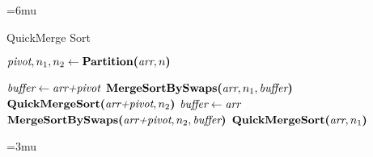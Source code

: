 \begin{algorithm}[H]
	\unboldmath
	\thinmuskip=6mu
	\caption{QuickMerge Sort}
	\begin{algorithmic}[1]
		
		\State
		  
		\EndIf
		
		\State
		\State $\textit{pivot}, n_1, n_2 \gets \textbf{Partition(}\textit{arr}, n\textbf{)}$ 
		
		\State
		 
			\State $\textit{buffer} \gets \textit{arr+pivot}$
			\State $\textbf{MergeSortBySwaps(}\textit{arr}, n_1, \textit{buffer}\textbf{)}$
			\State $\textbf{QuickMergeSort(}\textit{arr+pivot}, n_2\textbf{)}$
		\Else
			\State $\textit{buffer} \gets \textit{arr}$
			\State $\textbf{MergeSortBySwaps(}\textit{arr+pivot}, n_2, \textit{buffer}\textbf{)}$
			\State $\textbf{QuickMergeSort(}\textit{arr}, n_1\textbf{)}$
		\EndIf
		
		\EndProcedure
	\end{algorithmic}
	\boldmath
	\thinmuskip=3mu
	\label{pseudocode:quick-merge-sort}
\end{algorithm}

